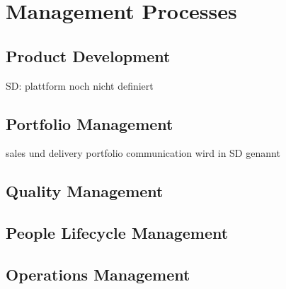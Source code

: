 	\section{Management Processes}
	\subsection{Product Development}
	SD: plattform noch nicht definiert
	
	\subsection{Portfolio Management}
	sales und delivery portfolio
	communication wird in SD genannt
	
	
	\subsection{Quality Management}
	\subsection{People Lifecycle Management}
	\subsection{Operations Management}
	
